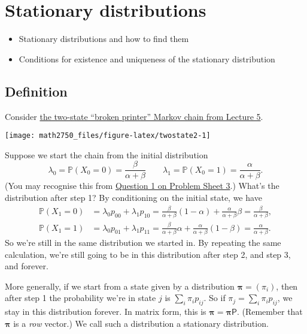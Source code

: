 \documentclass[
  a4paper,
]{article}
\providecommand{\tightlist}{%
  \setlength{\itemsep}{0pt}\setlength{\parskip}{0pt}}
\theoremstyle{definition}
\theoremstyle{definition}
\theoremstyle{definition}
\theoremstyle{remark}
\begin{document}
\hypertarget{S10-stationary-distributions}{%
\section{Stationary distributions}\label{S10-stationary-distributions}}

\begin{itemize}
\tightlist
\item
  Stationary distributions and how to find them
\item
  Conditions for existence and uniqueness of the stationary distribution
\end{itemize}

\hypertarget{def-stationary-definition}{%
\subsection{Definition}\label{def-stationary-definition}}

Consider \protect\hyperlink{S05-example}{the two-state ``broken printer'' Markov chain from Lecture 5}.

\begin{center}\texttt{[image: math2750\_files/figure-latex/twostate2-1]} \end{center}

Suppose we start the chain from the initial distribution
\[ \lambda_0 = \mathbb P(X_0 = 0) = \frac{\beta}{\alpha+\beta} \qquad \lambda_1 = \mathbb P(X_0 = 1) = \frac{\alpha}{\alpha+\beta} . \]
(You may recognise this from \protect\hyperlink{P03}{Question 1 on Problem Sheet 3}.) What's the distribution after step 1? By conditioning on the initial state, we have
\begin{align*}
  \mathbb P(X_1 = 0) &= \lambda_0 p_{00} + \lambda_1 p_{10} = \frac{\beta}{\alpha+\beta}(1-\alpha) + \frac{\alpha}{\alpha+\beta}\beta = \frac{\beta}{\alpha+\beta} ,\\
  \mathbb P(X_1 = 1) &= \lambda_0 p_{01} + \lambda_1 p_{11} = \frac{\beta}{\alpha+\beta}\alpha + \frac{\alpha}{\alpha+\beta}(1-\beta) = \frac{\alpha}{\alpha+\beta} .
\end{align*}
So we're still in the same distribution we started in. By repeating the same calculation, we're still going to be in this distribution after step 2, and step 3, and forever.

More generally, if we start from a state given by a distribution \(\boldsymbol \pi = (\pi_i)\), then after step 1 the probability we're in state \(j\) is \(\sum_i \pi_i p_{ij}\). So if \(\pi_j = \sum_i \pi_i p_{ij}\), we stay in this distribution forever. In matrix form, this is \(\boldsymbol \pi = \boldsymbol \pi\mathsf P\). (Remember that \(\boldsymbol \pi\) is a \emph{row} vector.) We call such a distribution a stationary distribution.
\end{document}
